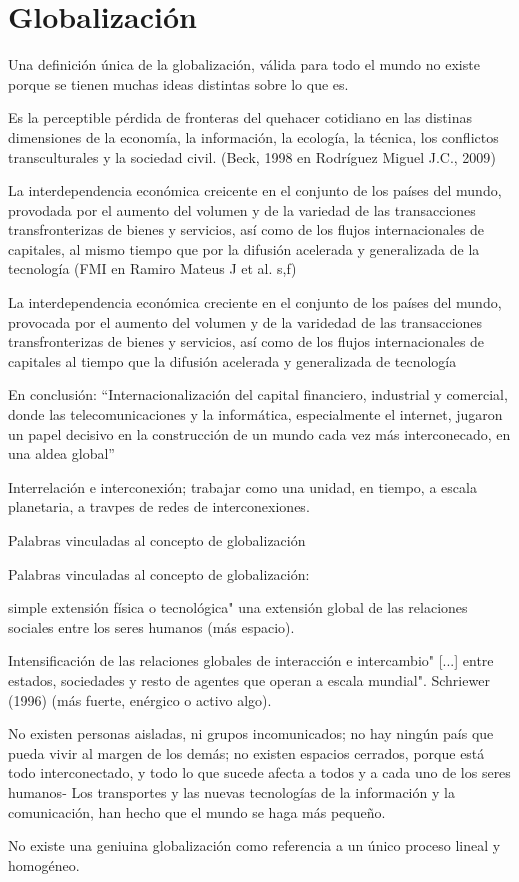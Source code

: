 \section{Globalización}
\begin{definition}[Globalización]
    Una definición única de la globalización, válida para todo el mundo no existe porque se tienen muchas ideas distintas sobre lo que es.

    Es la perceptible pérdida de fronteras del quehacer cotidiano en las distinas dimensiones de la economía, la información, la ecología, la técnica, los conflictos transculturales y la sociedad civil. (Beck, 1998 en Rodríguez Miguel J.C., 2009\cite{bini2009coefficient})

    La interdependencia económica creicente en el conjunto de los países del mundo, provodada por el aumento del volumen y de la variedad de las transacciones transfronterizas de bienes y servicios, así como de los flujos internacionales de capitales, al mismo tiempo que por la difusión acelerada y generalizada de la tecnología (FMI en Ramiro Mateus J et al. s,f\cite{mateus2002globalizacion})

    La interdependencia económica creciente en el conjunto de los países del mundo, provocada por el aumento del volumen y de la varidedad de las transacciones transfronterizas de bienes y servicios, así como de los flujos internacionales de capitales al tiempo que la difusión acelerada y generalizada de tecnología
\end{definition}
En conclusión: ``Internacionalización del capital financiero, industrial y comercial, donde las telecomunicaciones y la informática, especialmente el internet, jugaron un papel decisivo en la construcción de un mundo cada vez más interconecado, en una aldea global''

Interrelación e interconexión; trabajar como una unidad, en tiempo, a escala planetaria, a travpes de redes de interconexiones.

Palabras vinculadas al concepto de globalización

Palabras vinculadas al concepto de globalización:
\begin{definition}[\% Extensión]
    simple extensión física o tecnológica" una extensión global de las relaciones sociales entre los seres humanos (más espacio).
\end{definition}
\begin{definition}[Intensificación]
    Intensificación de las relaciones globales de interacción e intercambio" [...] entre estados, sociedades y resto de agentes que operan a escala mundial". Schriewer (1996) (más fuerte, enérgico o activo algo).
\end{definition}
\begin{definition}[\% Interdependencia]
    No existen personas aisladas, ni grupos incomunicados; no hay ningún país que pueda vivir al margen de los demás; no existen espacios cerrados, porque está todo interconectado, y todo lo que sucede afecta a todos y a cada uno de los seres humanos- Los transportes y las nuevas tecnologías de la información y la comunicación, han hecho que el mundo se haga más pequeño.
\end{definition}
No existe una geniuina globalización como referencia a un único proceso lineal y homogéneo.
